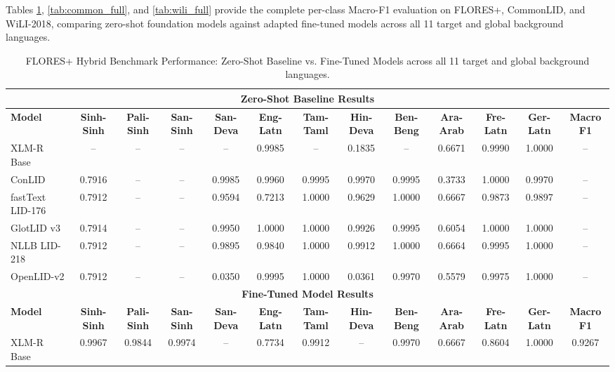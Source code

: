 \documentclass[11pt]{article}
\begin{document}
Tables \ref{tab:flores_full}, \ref{tab:common_full}, and \ref{tab:wili_full} provide the complete per-class Macro-F1 evaluation on FLORES+, CommonLID, and WiLI-2018, comparing zero-shot foundation models against adapted fine-tuned models across all 11 target and global background languages.

\begin{table}[p]
\centering
\scriptsize
\setlength{\tabcolsep}{2.2pt}
\renewcommand{\arraystretch}{0.90}
\caption{FLORES+ Hybrid Benchmark Performance: Zero-Shot Baseline vs. Fine-Tuned Models across all 11 target and global background languages.}
\label{tab:flores_full}
\begin{tabular}{l ccc cccccccc c}
\toprule
\multicolumn{13}{c}{\textbf{Zero-Shot Baseline Results}} \\
\midrule
\textbf{Model} & \textbf{Sinh-Sinh} & \textbf{Pali-Sinh} & \textbf{San-Sinh} & \textbf{San-Deva} & \textbf{Eng-Latn} & \textbf{Tam-Taml} & \textbf{Hin-Deva} & \textbf{Ben-Beng} & \textbf{Ara-Arab} & \textbf{Fre-Latn} & \textbf{Ger-Latn} & \textbf{Macro F1} \\
\midrule
XLM-R Base & -- & -- & -- & -- & 0.9985 & -- & 0.1835 & -- & 0.6671 & 0.9990 & 1.0000 & -- \\
ConLID & 0.7916 & -- & -- & 0.9985 & 0.9960 & 0.9995 & 0.9970 & 0.9995 & 0.3733 & 1.0000 & 0.9970 & -- \\
fastText LID-176 & 0.7912 & -- & -- & 0.9594 & 0.7213 & 1.0000 & 0.9629 & 1.0000 & 0.6667 & 0.9873 & 0.9897 & -- \\
GlotLID v3 & 0.7914 & -- & -- & 0.9950 & 1.0000 & 1.0000 & 0.9926 & 0.9995 & 0.6054 & 1.0000 & 1.0000 & -- \\
NLLB LID-218 & 0.7912 & -- & -- & 0.9895 & 0.9840 & 1.0000 & 0.9912 & 1.0000 & 0.6664 & 0.9995 & 1.0000 & -- \\
OpenLID-v2 & 0.7912 & -- & -- & 0.0350 & 0.9995 & 1.0000 & 0.0361 & 0.9970 & 0.5579 & 0.9975 & 1.0000 & -- \\
\midrule
\multicolumn{13}{c}{\textbf{Fine-Tuned Model Results}} \\
\midrule
\textbf{Model} & \textbf{Sinh-Sinh} & \textbf{Pali-Sinh} & \textbf{San-Sinh} & \textbf{San-Deva} & \textbf{Eng-Latn} & \textbf{Tam-Taml} & \textbf{Hin-Deva} & \textbf{Ben-Beng} & \textbf{Ara-Arab} & \textbf{Fre-Latn} & \textbf{Ger-Latn} & \textbf{Macro F1} \\
\midrule
XLM-R Base & 0.9967 & 0.9844 & 0.9974 & -- & 0.7734 & 0.9912 & -- & 0.9970 & 0.6667 & 0.8604 & 1.0000 & 0.9267 \\

\end{tabular}
\end{table}
\end{document}

